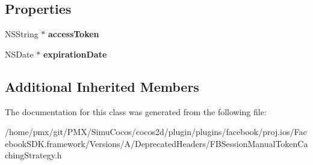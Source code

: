 \subsection*{Properties}
\begin{DoxyCompactItemize}
\item 
\mbox{\label{interfaceFBSessionManualTokenCachingStrategy_a34937f5dd4aeaa376e967a0e6117f5fd}} 
N\+S\+String $\ast$ {\bfseries access\+Token}
\item 
\mbox{\label{interfaceFBSessionManualTokenCachingStrategy_af55a4103000b8c7c262cd6c430c0a48a}} 
N\+S\+Date $\ast$ {\bfseries expiration\+Date}
\end{DoxyCompactItemize}
\subsection*{Additional Inherited Members}


The documentation for this class was generated from the following file\+:\begin{DoxyCompactItemize}
\item 
/home/pmx/git/\+P\+M\+X/\+Simu\+Cocos/cocos2d/plugin/plugins/facebook/proj.\+ios/\+Facebook\+S\+D\+K.\+framework/\+Versions/\+A/\+Deprecated\+Headers/F\+B\+Session\+Manual\+Token\+Caching\+Strategy.\+h\end{DoxyCompactItemize}

